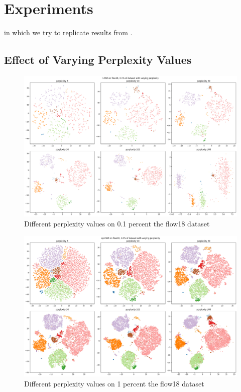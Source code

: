 \chapter{Experiments}\label{chapter:experiments}
in which we try to replicate results from \cite{belkina19}. 

\section{Effect of Varying Perplexity Values}
\begin{figure}[ht]
    \centering 
    \includegraphics[width=\linewidth]{figures/perp_flow_001.png}
    \caption{Different perplexity values on 0.1 percent the flow18 dataset}
    \label{fig:perp001}
\end{figure}

\begin{figure}[ht]
    \centering 
    \includegraphics[width=\linewidth]{figures/perp_flow_01.png}
    \caption{Different perplexity values on 1 percent the flow18 dataset}
    \label{fig:perp01}
\end{figure}

